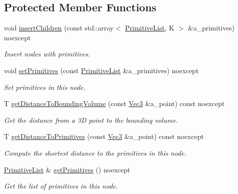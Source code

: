 \subsection*{Protected Member Functions}
\begin{DoxyCompactItemize}
\item 
void \hyperlink{classBVH_1_1NodeT_a83c128d1045ccc23000a8b26f75b3172}{insert\+Children} (const std\+::array$<$ \hyperlink{classBVH_1_1NodeT_a19cce6e7fbe85eccb4a3718dd69f49b7}{Primitive\+List}, K $>$ \&a\+\_\+primitives) noexcept
\begin{DoxyCompactList}\small\item\em Insert nodes with primitives. \end{DoxyCompactList}\item 
void \hyperlink{classBVH_1_1NodeT_a2c9c3d3a83b3c1895c8f89b2bbd62e81}{set\+Primitives} (const \hyperlink{classBVH_1_1NodeT_a19cce6e7fbe85eccb4a3718dd69f49b7}{Primitive\+List} \&a\+\_\+primitives) noexcept
\begin{DoxyCompactList}\small\item\em Set primitives in this node. \end{DoxyCompactList}\item 
T \hyperlink{classBVH_1_1NodeT_a8da9f78078b0a579868d026bd61a2947}{get\+Distance\+To\+Bounding\+Volume} (const \hyperlink{classBVH_1_1NodeT_a6fbb4308c5c55ee170c5f992df7ae1d0}{Vec3} \&a\+\_\+point) const noexcept
\begin{DoxyCompactList}\small\item\em Get the distance from a 3D point to the bounding volume. \end{DoxyCompactList}\item 
T \hyperlink{classBVH_1_1NodeT_a61dc7040d57f0a69984548eb4804244b}{get\+Distance\+To\+Primitives} (const \hyperlink{classBVH_1_1NodeT_a6fbb4308c5c55ee170c5f992df7ae1d0}{Vec3} \&a\+\_\+point) const noexcept
\begin{DoxyCompactList}\small\item\em Compute the shortest distance to the primitives in this node. \end{DoxyCompactList}\item 
\hyperlink{classBVH_1_1NodeT_a19cce6e7fbe85eccb4a3718dd69f49b7}{Primitive\+List} \& \hyperlink{classBVH_1_1NodeT_adce9d9c6bd4ab3d613bef232353774f3}{get\+Primitives} () noexcept
\begin{DoxyCompactList}\small\item\em Get the list of primitives in this node. \end{DoxyCompactList}\item 

\end{DoxyCompactItemize}
